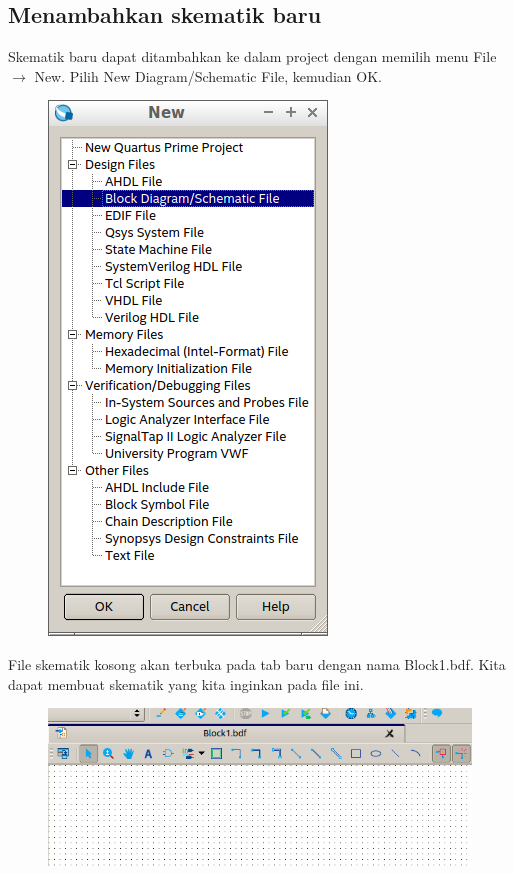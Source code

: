 \subsection{Menambahkan skematik baru}

Skematik baru dapat ditambahkan ke dalam project dengan memilih menu
{\sf File $\rightarrow$ New}. Pilih {\sf New Diagram/Schematic File}, kemudian
{\sf OK}.

\begin{figure}[H]
\centering
\includegraphics[scale=0.5]{images/NewSchematic.png}
\par
\end{figure}

File skematik kosong akan terbuka pada tab baru dengan nama {\sf Block1.bdf}.
Kita dapat membuat skematik yang kita inginkan pada file ini.

\begin{figure}[H]
\centering
\includegraphics[scale=0.5]{images/EmptySchematic.png}
\par
\end{figure}

